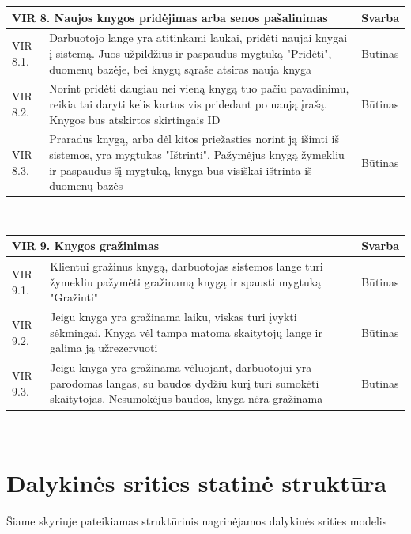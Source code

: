 \documentclass{VUMIFPSkursinis}
\begin{document}
    \noindent
\vspace{5mm}
    \begin{tabular}{ | p{} | p{} | p{} |}
    		\hline
   			\multicolumn{2}{|l|}{  VIR 8. Naujos knygos pridėjimas arba senos pašalinimas} &Svarba  \\ \hline 
		  	VIR 8.1. & Darbuotojo lange yra atitinkami laukai, pridėti naujai knygai į sistemą. Juos užpildžius ir paspaudus mygtuką "Pridėti", duomenų bazėje, bei knygų sąraše atsiras nauja knyga & Būtinas \\ \hline
            VIR 8.2. & Norint pridėti daugiau nei vieną knygą tuo pačiu pavadinimu, reikia tai daryti kelis kartus vis pridedant po naują įrašą. Knygos bus atskirtos skirtingais ID & Būtinas \\ \hline
            VIR 8.3. & Praradus knygą, arba dėl kitos priežasties norint ją išimti iš sistemos, yra mygtukas "Ištrinti". Pažymėjus knygą žymekliu ir paspaudus šį mygtuką, knyga bus visiškai ištrinta iš duomenų bazės & Būtinas \\ \hline
   	\end{tabular}\\
    
    \noindent
\vspace{5mm}
	\begin{tabular}{ | p{} | p{} | p{} |}
    		\hline
   			\multicolumn{2}{|l|}{ VIR 9. Knygos gražinimas} &Svarba  \\ \hline 
		  	VIR 9.1. & Klientui gražinus knygą, darbuotojas sistemos lange turi žymekliu pažymėti gražinamą knygą ir spausti mygtuką "Gražinti" & Būtinas \\ \hline
            VIR 9.2. & Jeigu knyga yra gražinama laiku, viskas turi įvykti sėkmingai. Knyga vėl tampa matoma skaitytojų lange ir galima ją užrezervuoti & Būtinas \\ \hline
            VIR 9.3. & Jeigu knyga yra gražinama vėluojant, darbuotojui yra parodomas langas, su baudos dydžiu kurį turi sumokėti skaitytojas. Nesumokėjus baudos, knyga nėra gražinama & Būtinas \\ \hline
   	\end{tabular}\\



\section{Dalykinės srities statinė struktūra}
Šiame skyriuje pateikiamas struktūrinis nagrinėjamos dalykinės srities modelis
\end{document}
